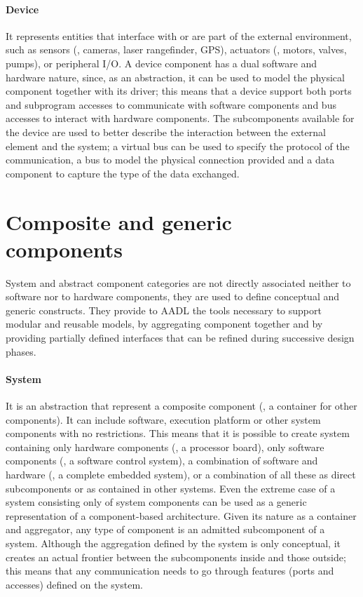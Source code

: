 \paragraph{Device} It represents entities that interface with or are part of the external environment, such as sensors (\eg, cameras, laser rangefinder, GPS), actuators (\eg, motors, valves, pumps), or peripheral I/O. A device component has a dual software and hardware nature, since, as an abstraction, it can be used to model the physical component together with its driver; this means that a device support both ports and subprogram accesses to communicate with software components and bus accesses to interact with hardware components. The subcomponents available for the device are used to better describe the interaction between the external element and the system; a virtual bus can be used to specify the protocol of the communication, a bus to model the physical connection provided and a data component to capture the type of the data exchanged.

\section[Composite and generic components]{Composite and generic\\components}
System and abstract component categories are not directly associated neither to software nor to hardware components, they are used to define conceptual and generic constructs. They provide to AADL the tools necessary to support modular and reusable models, by aggregating component together and by providing partially defined interfaces that can be refined during successive design phases.

\paragraph{System} It is an abstraction that represent a composite component (\ie, a container for other components). It can include software, execution platform or other system components with no restrictions. This means that it is possible to create system containing only hardware components (\eg, a processor board), only software components (\eg, a software control system), a combination of software and hardware (\eg, a complete embedded system),  or a combination of all these as direct subcomponents or as contained in other systems. Even the extreme case of a system consisting only of system components can be used as a generic representation of a component-based architecture. Given its nature as a container and aggregator, any type of component is an admitted subcomponent of a system. Although the aggregation defined by the system is only conceptual, it creates an actual frontier between the subcomponents inside and those outside; this means that any communication needs to go through features (\ie ports and accesses) defined on the system.

